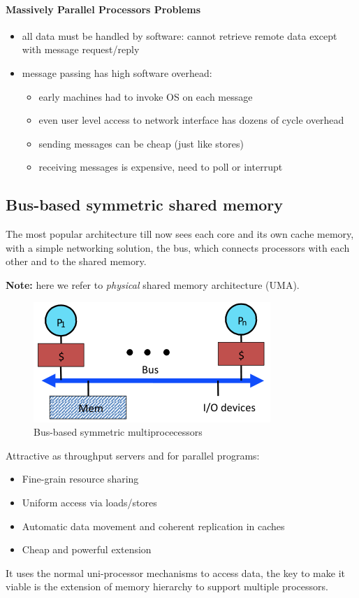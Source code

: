 \paragraph{Massively Parallel Processors Problems}
\begin{itemize}
    \item all data must be handled by software: cannot retrieve remote data except with message request/reply
    \item message passing has high software overhead:
    \begin{itemize}
        \item early machines had to invoke OS on each message
        \item even user level access to network interface has dozens of cycle overhead
        \item sending messages can be cheap (just like stores)
        \item receiving messages is expensive, need to poll or interrupt
    \end{itemize}
\end{itemize}

\subsection{Bus-based symmetric shared memory}\label{subsec:bus-based-symmetric-shared-memory}
The most popular architecture till now sees each core and its own cache memory, with a simple networking solution, the
bus, which connects processors with each other and to the shared memory.

\textbf{Note:} here we refer to \textit{physical} shared memory architecture (UMA).

\begin{figure}[h]
    \centering
    \includegraphics[scale = 0.45]{images/bus-based-symmetric-shared-memory}
    \caption{Bus-based symmetric multiprocecessors}
    \label{fig:bus-based-symmetric-shared-memory}
\end{figure}

Attractive as throughput servers and for parallel programs:
\begin{itemize}
    \item Fine-grain resource sharing
    \item Uniform access via loads/stores
    \item Automatic data movement and coherent replication in caches
    \item Cheap and powerful extension
\end{itemize}
It uses the normal uni-processor mechanisms to access data, the key to make it viable is the extension of memory
hierarchy to support multiple processors.

